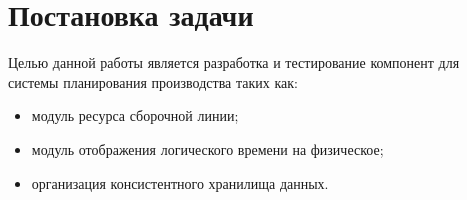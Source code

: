 \section{Постановка задачи}
Целью данной работы является разработка и тестирование компонент для системы планирования производства таких как:
\begin{itemize}
	\item модуль ресурса сборочной линии;
	\item модуль отображения логического времени на физическое;
	\item организация консистентного хранилища данных.
\end{itemize}